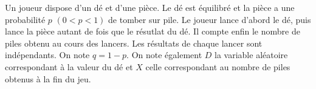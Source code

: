 \documentclass[a4paper]{tp_um}
\begin{document}
\begin{enumerate}


\end{enumerate}

\bigskip


\exo{} Un joueur dispose d'un dé et d'une pièce. Le dé est équilibré et la pièce a une probabilité $p$ $(0 < p < 1)$ de tomber sur pile. Le joueur lance d'abord le dé, puis lance la pièce autant de fois que le résutlat du dé.  Il compte enfin le nombre de piles obtenu au cours des lancers. Les résultats de chaque lancer sont indépendants. On note $q= 1-p$.  On note également $D$ la variable aléatoire correspondant à la valeur du dé et $X$ celle correspondant au nombre de piles obtenus à la fin du jeu.
\end{document}

